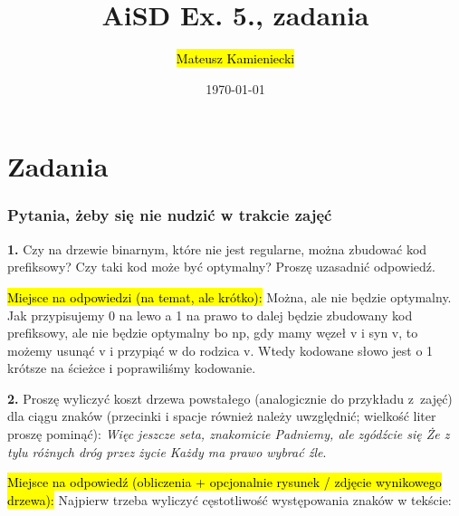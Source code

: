 \documentclass[twoside]{article}
\title{AiSD Ex. 5., zadania}
\author{\hl{Mateusz Kamieniecki}}
\date{\today}
\begin{document}
\pagestyle{fancy}
\fancyhead{}
\fancyhead[L]{\@title}
\fancyhead[R]{\@author}
\fancyhead[C]{\@date}

\cfoot{\thepage\ / \pageref{LastPage}}


\newpage
\section{Zadania}


\subsubsection{Pytania, żeby się nie nudzić w trakcie zajęć}
\label{section:questions_v2}

\textbf{1.} Czy na drzewie binarnym, które nie jest regularne, można zbudować kod prefiksowy? 
Czy taki kod może być optymalny?
Proszę uzasadnić odpowiedź.

\hl{Miejsce na odpowiedzi (na temat, ale krótko):}
Można, ale nie będzie optymalny. Jak przypisujemy 0 na lewo a 1 na prawo to
dalej będzie zbudowany kod prefiksowy, ale nie będzie optymalny bo np, gdy mamy
węzeł v i syn v, to możemy usunąć v i przypiąć w do rodzica v. Wtedy kodowane
słowo jest o 1 krótsze na ścieżce i poprawiliśmy kodowanie.
\newline

\textbf{2.} Proszę wyliczyć koszt drzewa powstałego (analogicznie do przykładu z~zajęć) dla ciągu znaków 
(przecinki i spacje również należy uwzględnić; wielkość liter proszę pominąć):
\textit{Więc jeszcze seta, znakomicie 
Padniemy, ale zgódźcie się 
Że z tylu różnych dróg przez życie
Każdy ma prawo wybrać źle}.

\hl{Miejsce na odpowiedź (obliczenia + opcjonalnie rysunek / zdjęcie wynikowego drzewa):}
Najpierw trzeba wyliczyć cęstotliwość występowania znaków w tekście:
\end{document}
